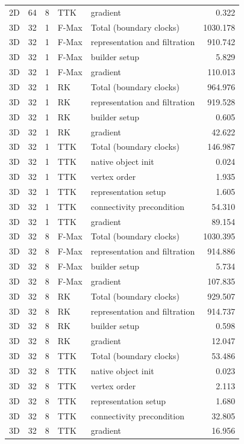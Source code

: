 \begin{tabular}{lrrllr}
2D & 64 & 8 & TTK & gradient & 0.322 \\
3D & 32 & 1 & F-Max & Total (boundary clocks) & 1030.178 \\
3D & 32 & 1 & F-Max & representation and filtration & 910.742 \\
3D & 32 & 1 & F-Max & builder setup & 5.829 \\
3D & 32 & 1 & F-Max & gradient & 110.013 \\
3D & 32 & 1 & RK & Total (boundary clocks) & 964.976 \\
3D & 32 & 1 & RK & representation and filtration & 919.528 \\
3D & 32 & 1 & RK & builder setup & 0.605 \\
3D & 32 & 1 & RK & gradient & 42.622 \\
3D & 32 & 1 & TTK & Total (boundary clocks) & 146.987 \\
3D & 32 & 1 & TTK & native object init & 0.024 \\
3D & 32 & 1 & TTK & vertex order & 1.935 \\
3D & 32 & 1 & TTK & representation setup & 1.605 \\
3D & 32 & 1 & TTK & connectivity precondition & 54.310 \\
3D & 32 & 1 & TTK & gradient & 89.154 \\
3D & 32 & 8 & F-Max & Total (boundary clocks) & 1030.395 \\
3D & 32 & 8 & F-Max & representation and filtration & 914.886 \\
3D & 32 & 8 & F-Max & builder setup & 5.734 \\
3D & 32 & 8 & F-Max & gradient & 107.835 \\
3D & 32 & 8 & RK & Total (boundary clocks) & 929.507 \\
3D & 32 & 8 & RK & representation and filtration & 914.737 \\
3D & 32 & 8 & RK & builder setup & 0.598 \\
3D & 32 & 8 & RK & gradient & 12.047 \\
3D & 32 & 8 & TTK & Total (boundary clocks) & 53.486 \\
3D & 32 & 8 & TTK & native object init & 0.023 \\
3D & 32 & 8 & TTK & vertex order & 2.113 \\
3D & 32 & 8 & TTK & representation setup & 1.680 \\
3D & 32 & 8 & TTK & connectivity precondition & 32.805 \\
3D & 32 & 8 & TTK & gradient & 16.956 \\
\hline
\end{tabular}
